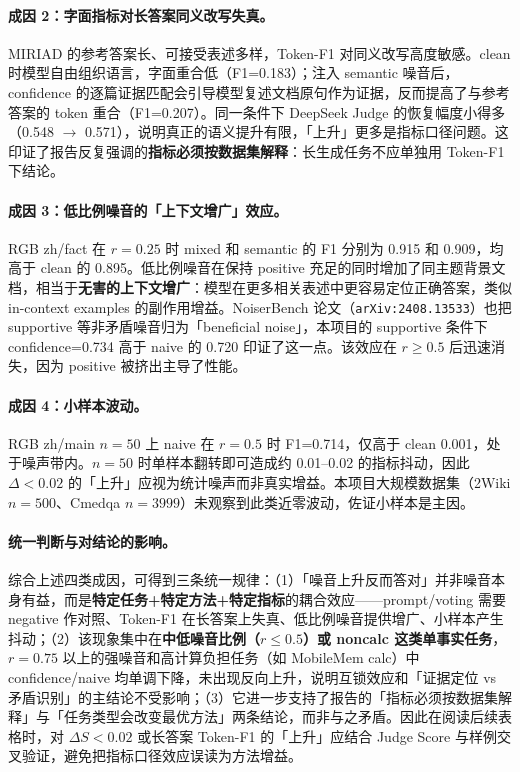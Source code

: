\documentclass[UTF8,zihao=-4]{ctexart}
\begin{document}
\paragraph{成因 2：字面指标对长答案同义改写失真。}
MIRIAD 的参考答案长、可接受表述多样，Token-F1 对同义改写高度敏感。clean 时模型自由组织语言，字面重合低（F1=0.183）；注入 semantic 噪音后，confidence 的逐篇证据匹配会引导模型复述文档原句作为证据，反而提高了与参考答案的 token 重合（F1=0.207）。同一条件下 DeepSeek Judge 的恢复幅度小得多（0.548 $\rightarrow$ 0.571），说明真正的语义提升有限，「上升」更多是指标口径问题。这印证了报告反复强调的\textbf{指标必须按数据集解释}：长生成任务不应单独用 Token-F1 下结论。

\paragraph{成因 3：低比例噪音的「上下文增广」效应。}
RGB zh/fact 在 $r=0.25$ 时 mixed 和 semantic 的 F1 分别为 0.915 和 0.909，均高于 clean 的 0.895。低比例噪音在保持 positive 充足的同时增加了同主题背景文档，相当于\textbf{无害的上下文增广}：模型在更多相关表述中更容易定位正确答案，类似 in-context examples 的副作用增益。NoiserBench 论文（\texttt{arXiv:2408.13533}）也把 supportive 等非矛盾噪音归为「beneficial noise」，本项目的 supportive 条件下 confidence=0.734 高于 naive 的 0.720 印证了这一点。该效应在 $r\geq 0.5$ 后迅速消失，因为 positive 被挤出主导了性能。

\paragraph{成因 4：小样本波动。}
RGB zh/main $n=50$ 上 naive 在 $r=0.5$ 时 F1=0.714，仅高于 clean 0.001，处于噪声带内。$n=50$ 时单样本翻转即可造成约 0.01--0.02 的指标抖动，因此 $\Delta<0.02$ 的「上升」应视为统计噪声而非真实增益。本项目大规模数据集（2Wiki $n=500$、Cmedqa $n=3999$）未观察到此类近零波动，佐证小样本是主因。

\paragraph{统一判断与对结论的影响。}
综合上述四类成因，可得到三条统一规律：（1）「噪音上升反而答对」并非噪音本身有益，而是\textbf{特定任务+特定方法+特定指标}的耦合效应——prompt/voting 需要 negative 作对照、Token-F1 在长答案上失真、低比例噪音提供增广、小样本产生抖动；（2）该现象集中在\textbf{中低噪音比例（$r\leq 0.5$）或 noncalc 这类单事实任务}，$r=0.75$ 以上的强噪音和高计算负担任务（如 MobileMem calc）中 confidence/naive 均单调下降，未出现反向上升，说明互锁效应和「证据定位 vs 矛盾识别」的主结论不受影响；（3）它进一步支持了报告的「指标必须按数据集解释」与「任务类型会改变最优方法」两条结论，而非与之矛盾。因此在阅读后续表格时，对 $\Delta S < 0.02$ 或长答案 Token-F1 的「上升」应结合 Judge Score 与样例交叉验证，避免把指标口径效应误读为方法增益。
\end{document}
